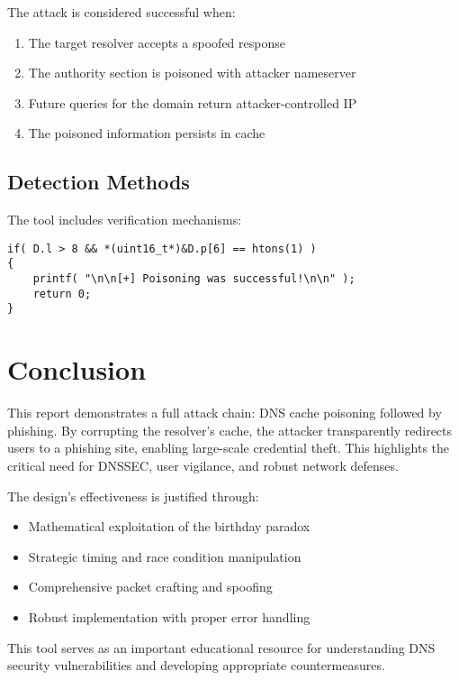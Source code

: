 \documentclass[12pt,a4paper]{article}
\begin{document}
The attack is considered successful when:
\begin{enumerate}
    \item The target resolver accepts a spoofed response
    \item The authority section is poisoned with attacker nameserver
    \item Future queries for the domain return attacker-controlled IP
    \item The poisoned information persists in cache
\end{enumerate}

\subsection{Detection Methods}

The tool includes verification mechanisms:
\begin{lstlisting}[caption=Attack Verification]
if( D.l > 8 && *(uint16_t*)&D.p[6] == htons(1) )
{
    printf( "\n\n[+] Poisoning was successful!\n\n" );
    return 0;
}
\end{lstlisting}

\section{Conclusion}

This report demonstrates a full attack chain: DNS cache poisoning followed by phishing. By corrupting the resolver's cache, the attacker transparently redirects users to a phishing site, enabling large-scale credential theft. This highlights the critical need for DNSSEC, user vigilance, and robust network defenses.

The design's effectiveness is justified through:
\begin{itemize}
    \item Mathematical exploitation of the birthday paradox
    \item Strategic timing and race condition manipulation
    \item Comprehensive packet crafting and spoofing
    \item Robust implementation with proper error handling
\end{itemize}

This tool serves as an important educational resource for understanding DNS security vulnerabilities and developing appropriate countermeasures.
\end{document}
